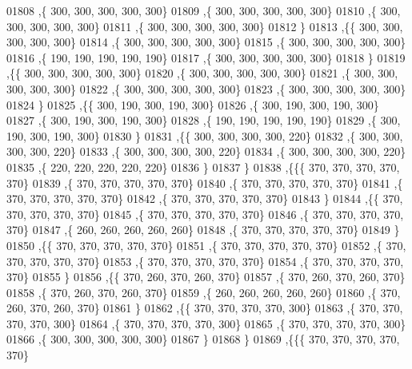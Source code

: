 \begin{DoxyCode}
01808    ,\{   300,   300,   300,   300,   300\}
01809    ,\{   300,   300,   300,   300,   300\}
01810    ,\{   300,   300,   300,   300,   300\}
01811    ,\{   300,   300,   300,   300,   300\}
01812    \}
01813   ,\{\{   300,   300,   300,   300,   300\}
01814    ,\{   300,   300,   300,   300,   300\}
01815    ,\{   300,   300,   300,   300,   300\}
01816    ,\{   190,   190,   190,   190,   190\}
01817    ,\{   300,   300,   300,   300,   300\}
01818    \}
01819   ,\{\{   300,   300,   300,   300,   300\}
01820    ,\{   300,   300,   300,   300,   300\}
01821    ,\{   300,   300,   300,   300,   300\}
01822    ,\{   300,   300,   300,   300,   300\}
01823    ,\{   300,   300,   300,   300,   300\}
01824    \}
01825   ,\{\{   300,   190,   300,   190,   300\}
01826    ,\{   300,   190,   300,   190,   300\}
01827    ,\{   300,   190,   300,   190,   300\}
01828    ,\{   190,   190,   190,   190,   190\}
01829    ,\{   300,   190,   300,   190,   300\}
01830    \}
01831   ,\{\{   300,   300,   300,   300,   220\}
01832    ,\{   300,   300,   300,   300,   220\}
01833    ,\{   300,   300,   300,   300,   220\}
01834    ,\{   300,   300,   300,   300,   220\}
01835    ,\{   220,   220,   220,   220,   220\}
01836    \}
01837   \}
01838  ,\{\{\{   370,   370,   370,   370,   370\}
01839    ,\{   370,   370,   370,   370,   370\}
01840    ,\{   370,   370,   370,   370,   370\}
01841    ,\{   370,   370,   370,   370,   370\}
01842    ,\{   370,   370,   370,   370,   370\}
01843    \}
01844   ,\{\{   370,   370,   370,   370,   370\}
01845    ,\{   370,   370,   370,   370,   370\}
01846    ,\{   370,   370,   370,   370,   370\}
01847    ,\{   260,   260,   260,   260,   260\}
01848    ,\{   370,   370,   370,   370,   370\}
01849    \}
01850   ,\{\{   370,   370,   370,   370,   370\}
01851    ,\{   370,   370,   370,   370,   370\}
01852    ,\{   370,   370,   370,   370,   370\}
01853    ,\{   370,   370,   370,   370,   370\}
01854    ,\{   370,   370,   370,   370,   370\}
01855    \}
01856   ,\{\{   370,   260,   370,   260,   370\}
01857    ,\{   370,   260,   370,   260,   370\}
01858    ,\{   370,   260,   370,   260,   370\}
01859    ,\{   260,   260,   260,   260,   260\}
01860    ,\{   370,   260,   370,   260,   370\}
01861    \}
01862   ,\{\{   370,   370,   370,   370,   300\}
01863    ,\{   370,   370,   370,   370,   300\}
01864    ,\{   370,   370,   370,   370,   300\}
01865    ,\{   370,   370,   370,   370,   300\}
01866    ,\{   300,   300,   300,   300,   300\}
01867    \}
01868   \}
01869  ,\{\{\{   370,   370,   370,   370,   370\}

\end{DoxyCode}
